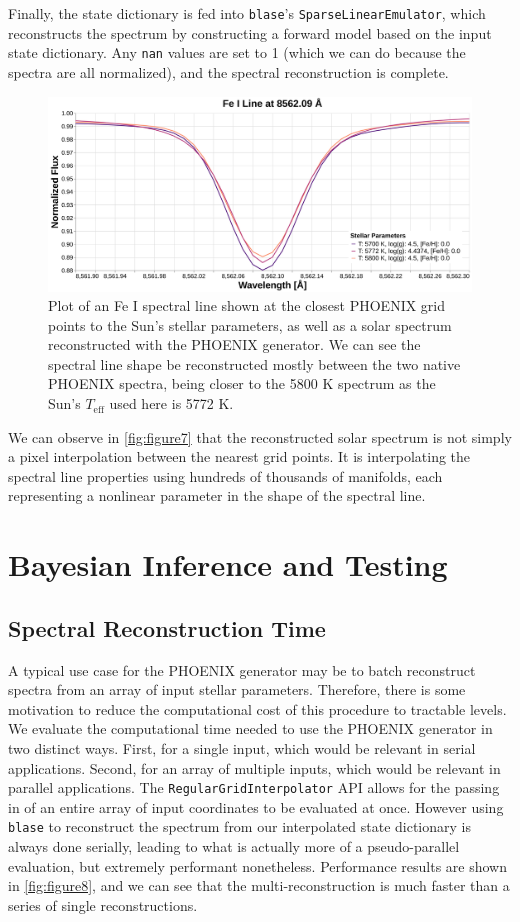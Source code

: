 \documentclass[twocolumn, linenumbers]{aastex631}
\begin{document}
Finally, the state dictionary is fed into \texttt{blase}'s \texttt{SparseLinearEmulator}, which reconstructs the spectrum by constructing a forward model based on the input state dictionary. 
Any \texttt{nan} values are set to 1 (which we can do because the spectra are all normalized), and the spectral reconstruction is complete.
\begin{figure}
    \centering
    \includegraphics[width=\textwidth]{figure7}
    \caption{Plot of an Fe I spectral line shown at the closest PHOENIX grid points to the Sun's stellar parameters, as well as a solar spectrum reconstructed with the PHOENIX generator.
    We can see the spectral line shape be reconstructed mostly between the two native PHOENIX spectra, being closer to the 5800 K spectrum as the Sun's $T_{\mathrm{eff}}$ used here is 5772 K.}
    \label{fig:figure7}
\end{figure}
We can observe in \autoref{fig:figure7} that the reconstructed solar spectrum is not simply a pixel interpolation between the nearest grid points.
It is interpolating the spectral line properties using hundreds of thousands of manifolds, each representing a nonlinear parameter in the shape of the spectral line.

\section{Bayesian Inference and Testing}
\subsection{Spectral Reconstruction Time}
A typical use case for the PHOENIX generator may be to batch reconstruct spectra from an array of input stellar parameters. 
Therefore, there is some motivation to reduce the computational cost of this procedure to tractable levels. 
We evaluate the computational time needed to use the PHOENIX generator in two distinct ways. 
First, for a single input, which would be relevant in serial applications. 
Second, for an array of multiple inputs, which would be relevant in parallel applications.
The \texttt{RegularGridInterpolator} API allows for the passing in of an entire array of input coordinates to be evaluated at once. 
However using \texttt{blase} to reconstruct the spectrum from our interpolated state dictionary is always done serially, leading to what is actually more of a pseudo-parallel evaluation, but extremely performant nonetheless. 
Performance results are shown in \autoref{fig:figure8}, and we can see that the multi-reconstruction is much faster than a series of single reconstructions.
\end{document}
